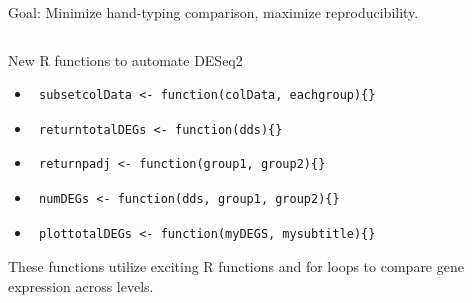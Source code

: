 \documentclass[final]{beamer}
\newlength{\onecolwid}
\newlength{\twocolwid}
\begin{document}
\begin{frame}[t]
\begin{columns}[t]
\begin{column}{\twocolwid} %

\vspace{-0.5em}

\begin{block}{Goal: Minimize hand-typing comparison, maximize reproducibility.} 

\end{block} 


\vspace{-2em}


\begin{columns}[t,totalwidth=\twocolwid] %

\begin{column}{\onecolwid} %

\vspace{-0.5em}

\begin{block}{{\normalsize New R functions to automate DESeq2}}

\begin{itemize}
  \item \begin{lstlisting} subsetcolData <- function(colData, eachgroup){} \end{lstlisting}
  \item \begin{lstlisting} returntotalDEGs <- function(dds){} \end{lstlisting}
  \item \begin{lstlisting} returnpadj <- function(group1, group2){} \end{lstlisting}
    \item \begin{lstlisting} numDEGs <- function(dds, group1, group2){} \end{lstlisting}
    \item \begin{lstlisting} plottotalDEGs <- function(myDEGS, mysubtitle){} \end{lstlisting}
\end{itemize}

These functions utilize exciting R functions and for loops to compare gene expression across levels.


\end{block}
\end{column}
\end{columns}
\end{column}
\end{columns}
\end{frame}
\end{document}
